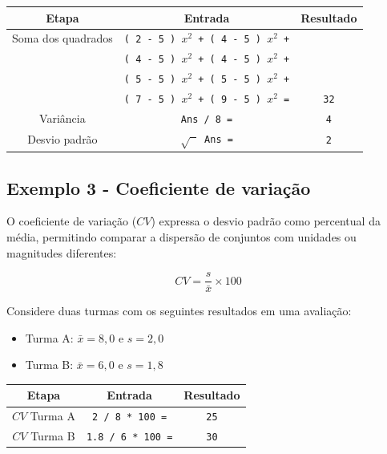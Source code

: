 \begin{center}
\begin{tabular}{|c|c|c|}
    \hline
    \textbf{Etapa} & \textbf{Entrada} & \textbf{Resultado} \\
    \hline
    Soma dos quadrados & \texttt{( 2 - 5 ) $x^2$ + ( 4 - 5 ) $x^2$ +} & \\
                       & \texttt{( 4 - 5 ) $x^2$ + ( 4 - 5 ) $x^2$ +} & \\
                       & \texttt{( 5 - 5 ) $x^2$ + ( 5 - 5 ) $x^2$ +} & \\
                       & \texttt{( 7 - 5 ) $x^2$ + ( 9 - 5 ) $x^2$ =} & \texttt{32} \\
    Variância & \texttt{Ans / 8 =} & \texttt{4} \\
    Desvio padrão & \texttt{$\sqrt{\phantom{x}}$ Ans =} & \texttt{2} \\
    \hline
\end{tabular}
\end{center}

\subsection*{Exemplo 3 - Coeficiente de variação}

O coeficiente de variação ($CV$) expressa o desvio padrão como percentual da média, permitindo comparar a dispersão de conjuntos com unidades ou magnitudes diferentes:

\[
    CV = \frac{s}{\bar{x}} \times 100
\]

Considere duas turmas com os seguintes resultados em uma avaliação:

\begin{itemize}
    \item Turma A: $\bar{x} = 8{,}0$ e $s = 2{,}0$
    \item Turma B: $\bar{x} = 6{,}0$ e $s = 1{,}8$
\end{itemize}

\begin{center}
\begin{tabular}{|c|c|c|}
    \hline
    \textbf{Etapa} & \textbf{Entrada} & \textbf{Resultado} \\
    \hline
    $CV$ Turma A & \texttt{2 / 8 * 100 =}   & \texttt{25} \\
    $CV$ Turma B & \texttt{1.8 / 6 * 100 =} & \texttt{30} \\
    \hline
\end{tabular}
\end{center}
